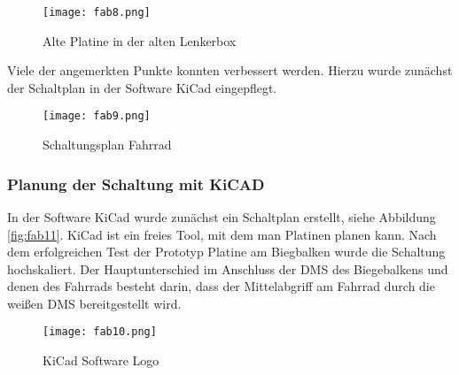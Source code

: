 \begin{figure}[htbp]
    \begin{center}
        \texttt{[image: fab8.png]}
        \caption[Alte Platine in der alten Lenkerbox (Abbildungsverzeichnis)]{Alte Platine in der alten Lenkerbox}
        
       \label{fig:fab8}
    \end{center}
\end{figure}

Viele der angemerkten Punkte konnten verbessert werden. Hierzu wurde zunächst der Schaltplan in der Software KiCad\cite{KiCadWebsite} eingepflegt.

\begin{figure}[h]
    \begin{center}
        \texttt{[image: fab9.png]}
        \caption[Schaltungsplan Fahrrad (Abbildungsverzeichnis)]{Schaltungsplan Fahrrad}
        
        \label{fig:fab9}
    \end{center}
\end{figure}

\subsubsection{Planung der Schaltung mit KiCAD}
In der Software KiCad\cite{KiCadWebsite} wurde zunächst ein Schaltplan erstellt, siehe Abbildung \ref{fig:fab11}.
KiCad ist ein freies Tool, mit dem man Platinen planen kann. Nach dem erfolgreichen Test der Prototyp Platine am Biegbalken wurde die Schaltung hochskaliert. Der Hauptunterschied im Anschluss der DMS des Biegebalkens und denen des Fahrrads besteht darin, dass der Mittelabgriff am Fahrrad durch die weißen DMS bereitgestellt wird.

\begin{figure}[htbp]
    \begin{center}
        \texttt{[image: fab10.png]}
        \caption[KiCad Software Logo (Abbildungsverzeichnis)]{KiCad Software Logo}
        \cite{KiCadWebsite}
        \label{fig:fab10}
    \end{center}
\end{figure}


